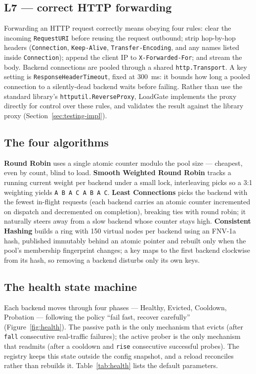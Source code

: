 \documentclass[11pt,a4paper]{report}
\newcommand{\code}[1]{\texttt{#1}}
\begin{document}
\subsection{L7 --- correct HTTP forwarding}
Forwarding an HTTP request correctly means obeying four rules: clear the incoming
\code{RequestURI} before reusing the request outbound; strip hop-by-hop headers (\code{Connection},
\code{Keep-\allowbreak Alive}, \code{Transfer-\allowbreak Encoding}, and any names listed inside \code{Connection});
append the client IP to \code{X-Forwarded-For}; and stream the body. Backend connections are
pooled through a shared \code{http.Transport}. A key setting is \code{ResponseHeaderTimeout},
fixed at 300~ms: it bounds how long a pooled connection to a silently-dead backend waits before
failing. Rather than use the standard library's \code{httputil.ReverseProxy}, LoadGate
implements the proxy directly for control over these rules, and validates the result against the
library proxy (Section~\ref{sec:testing-impl}).

\subsection{The four algorithms}
\textbf{Round Robin} uses a single atomic counter modulo the pool size --- cheapest, even by
count, blind to load. \textbf{Smooth Weighted Round Robin} tracks a running current weight per
backend under a small lock, interleaving picks so a 3:1 weighting yields
\code{A B A C A B A C}. \textbf{Least Connections} picks the backend with the fewest in-flight
requests (each backend carries an atomic counter incremented on dispatch and decremented on
completion), breaking ties with round robin; it naturally steers away from a slow backend whose
counter stays high. \textbf{Consistent Hashing} builds a ring with 150 virtual nodes per backend
using an FNV-1a hash, published immutably behind an atomic pointer and rebuilt only when the
pool's membership fingerprint changes; a key maps to the first backend clockwise from its hash,
so removing a backend disturbs only its own keys.

\subsection{The health state machine}
Each backend moves through four phases --- Healthy, Evicted, Cooldown, Probation ---
following the policy ``fail fast, recover carefully'' (Figure~\ref{fig:health}). The passive
path is the only mechanism that evicts (after \code{fall} consecutive real-traffic failures);
the active prober is the only mechanism that readmits (after a cooldown and \code{rise}
consecutive successful probes). The registry keeps this state outside the config snapshot, and a
reload reconciles rather than rebuilds it. Table~\ref{tab:health} lists the default parameters.
\end{document}
